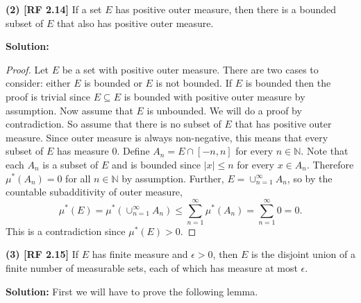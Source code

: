 \documentclass[12pt]{article}
\begin{document}
{\bf (2) [RF 2.14]} If a set $E$ has positive outer measure, then there is a bounded subset of $E$ that also has positive outer measure.

{\bf Solution:}

\begin{proof}
Let $E$ be a set with positive outer measure. There are two cases to consider: either $E$ is bounded or $E$ is not bounded. If $E$ is bounded then the
proof is trivial since $E \subseteq E$ is bounded with positive outer measure by assumption. Now assume that $E$ is unbounded. We will do a proof by
contradiction. So assume that there is no subset of $E$ that has positive outer measure. Since outer measure is always non-negative, this means that
every subset of $E$ has measure 0. Define $A_{n} = E \cap [-n, n]$ for every $n \in \mathbb{N}$. Note that each $A_{n}$ is a subset of $E$ and is bounded since $|x| \leq n$
for every $x \in A_{n}$. Therefore $\mu^{*}(A_{n}) = 0$ for all $n \in \mathbb{N}$ by assumption. Further, $E = \cup_{n=1}^{\infty}A_{n}$, so by the countable subadditivity of outer measure,
\[ \mu^{*}(E) = \mu^{*}\left( \cup_{n=1}^{\infty}A_{n} \right) \leq \sum_{n=1}^{\infty}\mu^{*}(A_{n}) = \sum_{n=1}^{\infty} 0 = 0. \]
This is a contradiction since $\mu^{*}(E) > 0$.  
\end{proof}

{\bf (3) [RF 2.15]} If $E$ has finite measure and $\epsilon > 0$, then $E$ is the disjoint union of a finite number of measurable sets, each of which
has measure at most $\epsilon$.

{\bf Solution:} First we will have to prove the following lemma.
\end{document}
